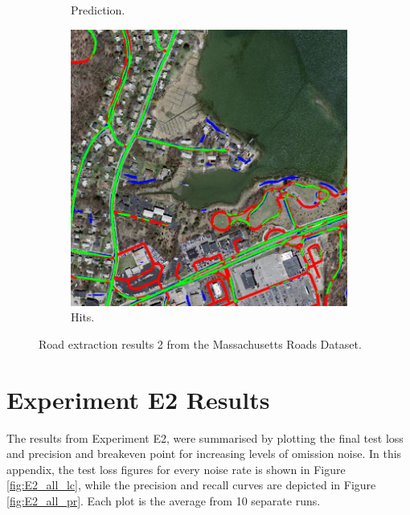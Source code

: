 \begin{figure}[H]
\begin{subfigure}{0.23\textwidth}
\caption{Prediction.}
\vspace{0.2cm} %
\end{subfigure}
\hspace*{\fill} %
\begin{subfigure}{0.23\textwidth}
\includegraphics[width=\textwidth]{figs/appendix/hit24628885_15.jpg}
\caption{Hits.}
\vspace{0.2cm} %
\end{subfigure}
\caption[Massachusetts Road extraction results 1]{Road extraction results 2 from the Massachusetts Roads Dataset.} \label{fiMass_app_results2}
\end{figure}

\section{Experiment E2 Results}
\label{app:fullE5results}

The results from Experiment E2, were summarised by plotting the final test loss and precision and breakeven point for increasing levels of omission noise. In this appendix, the test loss figures for every noise rate is shown in Figure \ref{fig:E2_all_lc}, while the precision and recall curves are depicted in Figure \ref{fig:E2_all_pr}. Each plot is the average from 10 separate runs.\\

